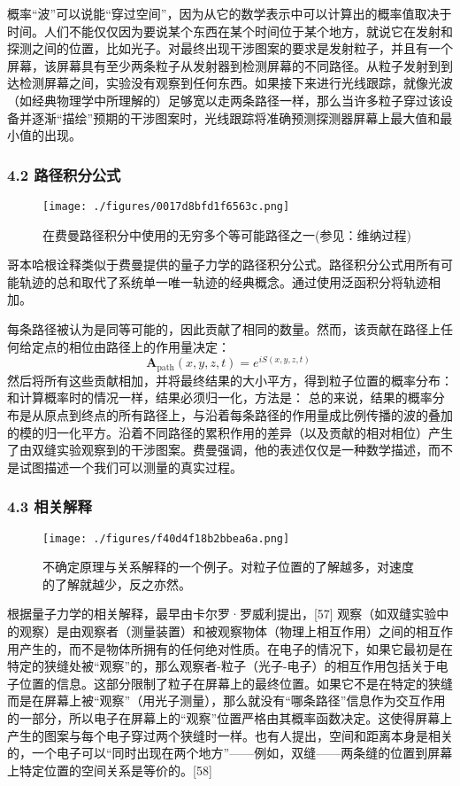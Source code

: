 概率“波”可以说能“穿过空间”，因为从它的数学表示中可以计算出的概率值取决于时间。人们不能仅仅因为要说某个东西在某个时间位于某个地方，就说它在发射和探测之间的位置，比如光子。对最终出现干涉图案的要求是发射粒子，并且有一个屏幕，该屏幕具有至少两条粒子从发射器到检测屏幕的不同路径。从粒子发射到到达检测屏幕之间，实验没有观察到任何东西。如果接下来进行光线跟踪，就像光波（如经典物理学中所理解的）足够宽以走两条路径一样，那么当许多粒子穿过该设备并逐渐“描绘”预期的干涉图案时，光线跟踪将准确预测探测器屏幕上最大值和最小值的出现。
\subsubsection{4.2 路径积分公式}
\begin{figure}[ht]
\centering
\texttt{[image: ./figures/0017d8bfd1f6563c.png]}
\caption{在费曼路径积分中使用的无穷多个等可能路径之一(参见：维纳过程)} \label{fig_SFSY_8}
\end{figure}
哥本哈根诠释类似于费曼提供的量子力学的路径积分公式。路径积分公式用所有可能轨迹的总和取代了系统单一唯一轨迹的经典概念。通过使用泛函积分将轨迹相加。

每条路径被认为是同等可能的，因此贡献了相同的数量。然而，该贡献在路径上任何给定点的相位由路径上的作用量决定：
$$\mathbf{A}_{\text{path}}(x, y, z, t) = e^{i S(x, y, z, t)}~$$
然后将所有这些贡献相加，并将最终结果的大小平方，得到粒子位置的概率分布：
和计算概率时的情况一样，结果必须归一化，方法是：
总的来说，结果的概率分布是从原点到终点的所有路径上，与沿着每条路径的作用量成比例传播的波的叠加的模的归一化平方。沿着不同路径的累积作用的差异（以及贡献的相对相位）产生了由双缝实验观察到的干涉图案。费曼强调，他的表述仅仅是一种数学描述，而不是试图描述一个我们可以测量的真实过程。
\subsubsection{4.3 相关解释}
\begin{figure}[ht]
\centering
\texttt{[image: ./figures/f40d4f18b2bbea6a.png]}
\caption{不确定原理与关系解释的一个例子。对粒子位置的了解越多，对速度的了解就越少，反之亦然。} \label{fig_SFSY_9}
\end{figure}
根据量子力学的相关解释，最早由卡尔罗·罗威利提出，[57] 观察（如双缝实验中的观察）是由观察者（测量装置）和被观察物体（物理上相互作用）之间的相互作用产生的，而不是物体所拥有的任何绝对性质。在电子的情况下，如果它最初是在特定的狭缝处被“观察”的，那么观察者-粒子（光子-电子）的相互作用包括关于电子位置的信息。这部分限制了粒子在屏幕上的最终位置。如果它不是在特定的狭缝而是在屏幕上被“观察”（用光子测量），那么就没有“哪条路径”信息作为交互作用的一部分，所以电子在屏幕上的“观察”位置严格由其概率函数决定。这使得屏幕上产生的图案与每个电子穿过两个狭缝时一样。也有人提出，空间和距离本身是相关的，一个电子可以“同时出现在两个地方”——例如，双缝——两条缝的位置到屏幕上特定位置的空间关系是等价的。[58]
